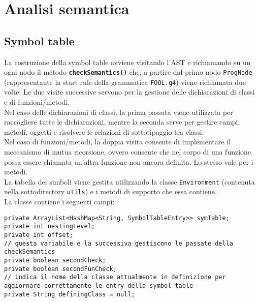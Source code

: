 \documentclass[a4paper]{article}   %
\begin{document}
\section{Analisi semantica}
\subsection{Symbol table}

La costruzione della symbol table avviene visitando l'AST e richiamando su un ogni nodo il metodo \textbf{\lstinline|checkSemantics()|} che, a partire dal primo nodo \lstinline|ProgNode| (rappresentante la start rule della grammatica \lstinline|FOOL.g4|) viene richiamata due volte. Le due visite successive servono per la gestione delle dichiarazioni di classi e di funzioni/metodi.\\
Nel caso delle dichiarazioni di classi, la prima passata viene utilizzata per raccogliere tutte le dichiarazioni, mentre la seconda serve per gestire campi, metodi, oggetti e risolvere le relazioni di sottotipaggio tra classi.\\
Nel caso di funzioni/metodi, la doppia visita consente di implementare il meccanismo di mutua ricorsione, ovvero consente che nel corpo di una funzione possa essere chiamata un'altra funzione non ancora definita. Lo stesso vale per i metodi.\\

La tabella dei simboli viene gestita utilizzando la classe \lstinline|Environment| (contenuta nella sottodirectory \lstinline|utils|) e i metodi di supporto che essa contiene.\\
La classe contiene i seguenti campi:\\

\begin{lstlisting}[basicstyle=\footnotesize\ttfamily]
private ArrayList<HashMap<String, SymbolTableEntry>> symTable;
private int nestingLevel;
private int offset;
// questa variabile e la successiva gestiscono le passate della checkSemantics
private boolean secondCheck;
private boolean secondFunCheck;
// indica il nome della classe attualmente in definizione per aggiornare correttamente le entry della symbol table
private String definingClass = null;
\end{lstlisting}
\end{document}
